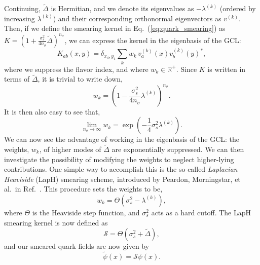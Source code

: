     Continuing, $\widetilde\Delta$ is Hermitian, and we denote its eigenvalues as $-\lambda^{(k)}$ (ordered by increasing $\lambda^{(k)}$) and their corresponding orthonormal eigenvectors as $v^{(k)}$. Then, if we define the smearing kernel in Eq.~(\ref{eq:quark_smearing}) as $K=\left(1+\frac{\sigma_{s}^{2}}{4 n_{\sigma}} \widetilde{\Delta}\right)^{n_{\sigma}}$, we can express the kernel in the eigenbasis of the GCL:
    \begin{equation}
        K_{a b}(x, y)=\delta_{x_{4}, y_{4}} \sum_{k} w_{k}\,v_{a}^{(k)}(x) v_{b}^{(k)}(y)^{*},
    \end{equation}
    where we suppress the flavor index, and where $w_k\in\mathbb{R}^+$. Since $K$ is written in terms of $\widetilde\Delta$, it is trivial to write down,
    \begin{equation}
        w_{k}=\left(1-\frac{\sigma_{s}^{2}}{4 n_{\sigma}} \lambda^{(k)}\right)^{n_{\sigma}}.
    \end{equation}
    It is then also easy to see that,
    \begin{equation}
        \lim _{n_{\sigma} \rightarrow \infty} w_{k}=\exp \left(-\frac{1}{4} \sigma_{s}^{2} \lambda^{(k)}\right).
    \end{equation}
    We can now see the advantage of working in the eigenbasis of the GCL: the weights, $w_{k}$, of higher modes of $\widetilde\Delta$ are exponentially suppressed. We can then investigate the possibility of modifying the weights to neglect higher-lying contributions. One simple way to accomplish this is the so-called \emph{Laplacian Heaviside} (LapH) smearing scheme, introduced by Peardon, Morningstar, et al.\ in Ref.~\cite{Peardon:2009gh}. This procedure sets the weights to be,
    \begin{equation}
        w_{k}=\Theta\left(\sigma_{s}^{2}-\lambda^{(k)}\right),
    \end{equation}
    where $\Theta$ is the Heaviside step function, and $\sigma_s^2$ acts as a hard cutoff. The LapH smearing kernel is now defined as
    \begin{equation}\label{eq:smearing_operator}
        \mathcal{S}=\Theta\left(\sigma_{s}^{2}+\widetilde{\Delta}\right),
    \end{equation}
    and our smeared quark fields are now given by
    \begin{equation}
        \widetilde\psi(x) = \mathcal{S}\psi(x).
    \end{equation}


